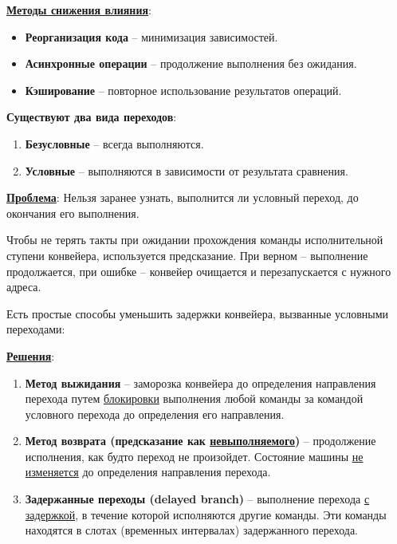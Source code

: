 	\textbf{\uline{Методы снижения влияния}}:
	
	\begin{itemize}
		\item \textbf{Реорганизация кода} -- минимизация зависимостей.
		\item \textbf{Асинхронные операции} -- продолжение выполнения без ожидания.
		\item \textbf{Кэширование} -- повторное использование результатов операций.
	\end{itemize}
	
	\textbf{Существуют два вида переходов}:
	
	\begin{enumerate}
		\item \textbf{Безусловные} -- всегда выполняются.
		\item \textbf{Условные} -- выполняются в зависимости от результата сравнения.
	\end{enumerate}
	
	\textbf{\uline{Проблема}}: Нельзя заранее узнать, выполнится ли условный переход, до окончания его выполнения. 
	\par
	Чтобы не терять такты при ожидании прохождения команды исполнительной ступени конвейера, используется предсказание. При верном -- выполнение продолжается, при ошибке -- конвейер очищается и перезапускается с нужного адреса.
	\par
	Есть простые способы уменьшить задержки конвейера, вызванные условными переходами:
	
	\textbf{\uline{Решения}}:
	
	\begin{enumerate}[leftmargin=2em]
		\item \textbf{Метод выжидания} -- заморозка конвейера до определения направления перехода путем \uline{блокировки} выполнения любой команды за командой условного перехода до определения его направления.
		\item \textbf{Метод возврата (предсказание как \uline{невыполняемого})} -- продолжение исполнения, как будто переход не произойдет. Состояние машины \uline{не изменяется} до определения направления перехода.
		\item \textbf{Задержанные переходы (delayed branch)} -- выполнение перехода \uline{с задержкой}, в течение которой исполняются другие команды. Эти команды находятся в слотах (временных интервалах) задержанного перехода.
	\end{enumerate}
	
	\newpage
	
